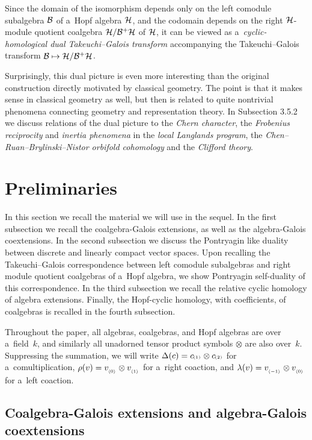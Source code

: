 \documentclass[pdftex]{sigma}
\numberwithin{equation}{section}
\newcommand{\ps}[1]{~\hspace{-4pt}_{^{(#1)}}}
\newcommand{\ns}[1]{~\hspace{-4pt}_{_{{\langle#1\rangle}}}}
\begin{document}
\smallskip

Since the domain of the isomorphism depends only on the left comodule subalgebra ${\cal B}$ of a~Hopf algebra ${\cal
H}$, and the codomain depends on the right ${\cal H}$-module quotient coalgebra ${\cal H}/{\cal B}^{+}{\cal H}$ of
${\cal H}$, it can be viewed as a~\emph{cyclic-homological dual Takeuchi--Galois transform} accompanying the
Takeuchi--Galois transform ${\cal B}\mapsto {\cal H}/{\cal B}^{+}{\cal H}$.

Surprisingly, this dual picture is even more interesting than the original construction directly motivated by classical
geometry.
The point is that it makes sense in classical geometry as well, but then is related to quite nontrivial phenomena
connecting geometry and representation theory.
In Subsection 3.5.2 we discuss relations of the dual picture to the \emph{Chern character}, the \emph{Frobenius
reciprocity} and \emph{inertia phenomena} in the \emph{local Langlands program}, the \emph{Chen--Ruan--Brylinski--Nistor
orbifold cohomology} and the \emph{Clifford theory}.

\section{Preliminaries}

In this section we recall the material we will use in the sequel.
In the f\/irst subsection we recall the coalgebra-Galois extensions, as well as the algebra-Galois coextensions.
In the second subsection we discuss the Pontryagin like duality between discrete and linearly compact vector spaces.
Upon recalling the Takeuchi--Galois correspondence between left comodule subalgebras and right module quotient
coalgebras of a~Hopf algebra, we show Pontryagin self-duality of this correspondence.
In the third subsection we recall the relative cyclic homology of algebra extensions.
Finally, the Hopf-cyclic homology, with coef\/f\/icients, of coalgebras is recalled in the fourth subsection.

Throughout the paper, all algebras, coalgebras, and Hopf algebras are over a~f\/ield~$k$, and similarly all unadorned
tensor product symbols $\otimes$ are also over~$k$.
Suppressing the summation, we will write $\Delta(c)=c\ps{1}\otimes c\ps{2}$ for a~comultiplication,
$\rho(v)=v\ns{0}\otimes v\ns{1}$ for a~right coaction, and $\lambda(v)=v\ns{-1}\otimes v\ns{0}$ for a~left coaction.

\subsection{Coalgebra-Galois extensions and algebra-Galois coextensions}
\end{document}
